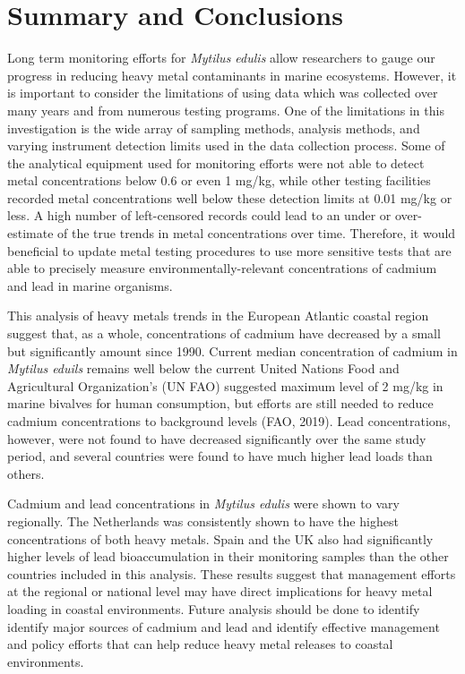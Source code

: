 \documentclass[
  12pt,
]{article}
\begin{document}
\newpage

\hypertarget{summary-and-conclusions}{%
\section{Summary and Conclusions}\label{summary-and-conclusions}}

Long term monitoring efforts for \emph{Mytilus edulis} allow researchers
to gauge our progress in reducing heavy metal contaminants in marine
ecosystems. However, it is important to consider the limitations of
using data which was collected over many years and from numerous testing
programs. One of the limitations in this investigation is the wide array
of sampling methods, analysis methods, and varying instrument detection
limits used in the data collection process. Some of the analytical
equipment used for monitoring efforts were not able to detect metal
concentrations below 0.6 or even 1 mg/kg, while other testing facilities
recorded metal concentrations well below these detection limits at 0.01
mg/kg or less. A high number of left-censored records could lead to an
under or over-estimate of the true trends in metal concentrations over
time. Therefore, it would beneficial to update metal testing procedures
to use more sensitive tests that are able to precisely measure
environmentally-relevant concentrations of cadmium and lead in marine
organisms.

This analysis of heavy metals trends in the European Atlantic coastal
region suggest that, as a whole, concentrations of cadmium have
decreased by a small but significantly amount since 1990. Current median
concentration of cadmium in \emph{Mytilus eduils} remains well below the
current United Nations Food and Agricultural Organization's (UN FAO)
suggested maximum level of 2 mg/kg in marine bivalves for human
consumption, but efforts are still needed to reduce cadmium
concentrations to background levels (FAO, 2019). Lead concentrations,
however, were not found to have decreased significantly over the same
study period, and several countries were found to have much higher lead
loads than others.

Cadmium and lead concentrations in \emph{Mytilus edulis} were shown to
vary regionally. The Netherlands was consistently shown to have the
highest concentrations of both heavy metals. Spain and the UK also had
significantly higher levels of lead bioaccumulation in their monitoring
samples than the other countries included in this analysis. These
results suggest that management efforts at the regional or national
level may have direct implications for heavy metal loading in coastal
environments. Future analysis should be done to identify identify major
sources of cadmium and lead and identify effective management and policy
efforts that can help reduce heavy metal releases to coastal
environments.
\end{document}
